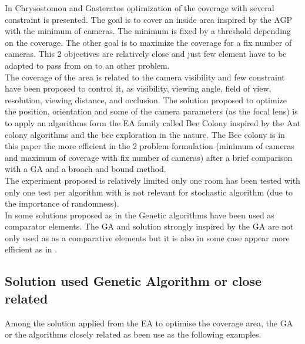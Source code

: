  In Chrysostomou and Gasteratos \cite{82*chrysostomou2012} optimization of the coverage with several constraint is presented.  The goal is to cover an inside area inspired by the AGP with the minimum of cameras. The minimum is fixed by a threshold depending on the coverage. The other goal is to maximize the coverage for a fix number of cameras. This 2 objectives are relatively close and just few element have to be adapted to pass from on to an other problem.\\
The coverage of the area is related to the camera visibility and few constraint have been proposed to control it, as visibility, viewing angle, field of view, resolution, viewing distance, and occlusion. The solution proposed to optimize the position, orientation and some of the camera parameters (as the focal lens) is to apply an algorithms form the EA family called Bee Colony inspired by the Ant colony algorithms and the bee exploration in the nature. The Bee colony is in this paper the more efficient in the 2 problem formulation (minimum of cameras and maximum of coverage with fix number of cameras) after a brief comparison with a GA and a broach and bound method. \\
The experiment proposed is relatively limited only one room has been tested with only one test per algorithm with is not relevant for stochastic algorithm (due to the importance of randomness).  \\

In some solutions proposed as in \cite{82*chrysostomou2012,33*reddy2012,141*akbarzadeh2013} the Genetic algorithms have been used as comparator elements. The GA and solution strongly inspired by the GA  are not only used as as a comparative elements but it is also in some case appear more efficient as in \cite{83*van2009,101*topcuoglu2009,165*jiang2010,152*wang2009}.

\subsection{Solution used Genetic Algorithm or close related}

 Among the solution applied from the EA to optimise the coverage area, the GA or the algorithms closely related as been use as the following examples. \\

